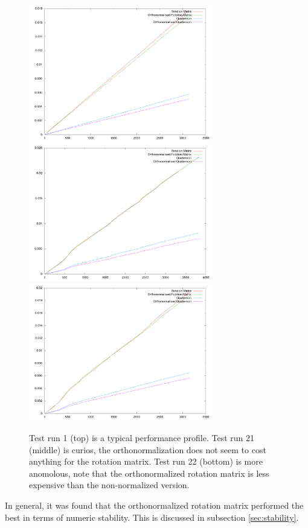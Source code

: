 \documentclass{acm_proc_article-sp}
\begin{document}
\begin{figure}[htpb]
\begin{framed}
\includegraphics[width=8cm]{plots/timing_plot_1.png}
\includegraphics[width=8cm]{plots/timing_plot_21.png}
\includegraphics[width=8cm]{plots/timing_plot_22.png}
\caption{Test run 1 (top) is a typical performance profile.
Test run 21 (middle) is curios, the orthonormalization does not seem to cost anything for the rotation matrix.
Test run 22 (bottom) is more anomolous, note that the orthonormalized rotation matrix is less expensive than the non-normalized version.}
\end{framed}
\label{fig:performance}
\end{figure}

In general, it was found that the orthonormalized rotation matrix performed the best in terms of numeric stability.
This is discussed in subsection \ref{sec:stability}.
\end{document}
